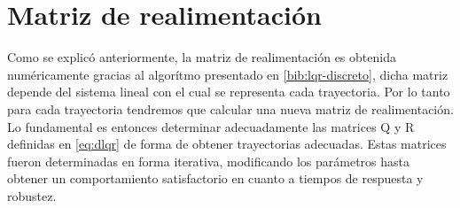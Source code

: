 \documentclass[main]{subfiles}
\begin{document}
\section{Matriz de realimentaci\'on}

Como se explic\'o anteriormente, la matriz de realimentaci\'on es obtenida num\'ericamente gracias al algor\'itmo presentado en \ref{bib:lqr-discreto}, dicha matriz depende del sistema lineal con el cual se representa cada trayectoria. Por lo tanto para cada trayectoria tendremos que calcular una nueva matriz de realimentaci\'on. Lo fundamental es entonces determinar adecuadamente las matrices Q y R definidas en \ref{eq:dlqr} de forma de obtener trayectorias adecuadas. Estas matrices fueron determinadas en forma iterativa, modificando los par\'ametros hasta obtener un comportamiento satisfactorio en cuanto a tiempos de respuesta y robustez.\\
\end{document}
